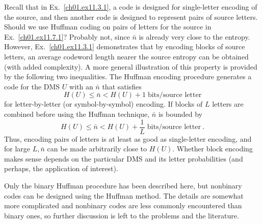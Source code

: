 Recall that in Ex.~\ref{ch01.ex11.3.1}, a code is designed for
single-letter encoding of the source, and then another code is designed
to represent pairs of source letters.
Should we use Huffman coding on pairs of letters for the source in
Ex.~\ref{ch01.ex11.7.1}?
Probably not, since $\bar{n}$ is already very close to the entropy.
However, Ex.~\ref{ch01.ex11.3.1} demonstrates that by encoding blocks
of source letters, an average codeword length nearer the source
entropy can be obtained (with added complexity).
A more general illustration of this property is provided by
the following two inequalities.
The Huffman encoding procedure generates a code for the DMS $U$ with
an $\bar{n}$ that satisfies
\begin{equation}
        H(U) \leq \bar{n} < H(U) + 1 \; \text{bits/source letter}
\label{ch01.eq11.7.2}
\end{equation}
for letter-by-letter (or symbol-by-symbol) encoding.
If blocks of $L$ letters are combined before using the Huffman technique,
$\bar{n}$ is bounded by
\begin{equation}
   H(U) \leq \bar{n} < H(U) + \frac{1}{L} \; \text{bits/source letter}~.
\label{ch01.eq11.7.3}
\end{equation}
Thus, encoding pairs of letters is at least as good as single-letter
encoding, and for large $L, \bar{n}$ can be made arbitrarily close to
$H(U)$.
Whether block encoding makes sense depends on the particular DMS and
its letter probabilities (and perhaps, the application of interest).

Only the binary Huffman procedure has been described here,
but nonbinary codes can be designed using the Huffman method.
The details are somewhat more complicated and nonbinary codes
are less commonly encountered than binary ones,
so further discussion is left to the problems and the literature.

\begin{table}[hbt]
\caption{Timer0 Compare Output Mode, non-PWM Mode}
\label{ch01.tab7} 
\end{table}


